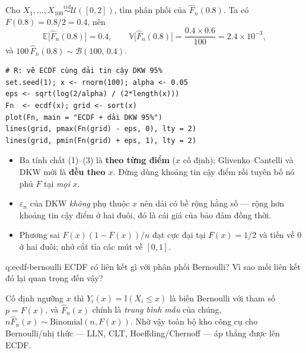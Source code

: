 Cho $X_1,\dots,X_{100}\overset{iid}{\sim}\mathcal{U}([0,2])$, tìm phân phối của $\widehat F_n(0.8)$. Ta có $F(0.8)=0.8/2=0.4$, nên
\[
\mathbb{E}\big[\widehat F_n(0.8)\big]=0.4,\qquad
\mathbb{V}\big[\widehat F_n(0.8)\big]=\frac{0.4\times 0.6}{100}=2.4\times10^{-3},
\]
và $100\,\widehat F_n(0.8)\sim\mathcal{B}(100,\,0.4)$.

\begin{verbatim}
# R: vẽ ECDF cùng dải tin cậy DKW 95%
set.seed(1); x <- rnorm(100); alpha <- 0.05
eps <- sqrt(log(2/alpha) / (2*length(x)))
Fn  <- ecdf(x); grid <- sort(x)
plot(Fn, main = "ECDF + dải DKW 95%")
lines(grid, pmax(Fn(grid) - eps, 0), lty = 2)
lines(grid, pmin(Fn(grid) + eps, 1), lty = 2)
\end{verbatim}

\begin{luuy}
\begin{itemize}
\item Ba tính chất (1)--(3) là \textbf{theo từng điểm} ($x$ cố định); Glivenko--Cantelli và DKW mới là \textbf{đều theo $x$}. Đừng dùng khoảng tin cậy điểm rồi tuyên bố nó phủ $F$ tại \emph{mọi} $x$.
\item $\varepsilon_n$ của DKW \emph{không} phụ thuộc $x$ nên dải có bề rộng hằng số --- rộng hơn khoảng tin cậy điểm ở hai đuôi, đó là cái giá của bảo đảm đồng thời.
\item Phương sai $F(x)(1-F(x))/n$ đạt cực đại tại $F(x)=1/2$ và tiến về $0$ ở hai đuôi; nhớ cắt tỉa các mút về $[0,1]$.
\end{itemize}
\end{luuy}


\begin{cauhoi}{q:ecdf-bernoulli}
ECDF có liên kết gì với phân phối Bernoulli? Vì sao mối liên kết đó lại quan trọng đến vậy?
\end{cauhoi}

\begin{chot}
Cố định ngưỡng $x$ thì $Y_i(x)=\mathbb{I}(X_i\le x)$ là biến Bernoulli với tham số $p=F(x)$, và $\widehat F_n(x)$ chính là \emph{trung bình mẫu} của chúng, $n\widehat F_n(x)\sim\mathrm{Binomial}(n,F(x))$. Nhờ vậy toàn bộ kho công cụ cho Bernoulli/nhị thức --- LLN, CLT, Hoeffding/Chernoff --- áp thẳng được lên ECDF.
\end{chot}

